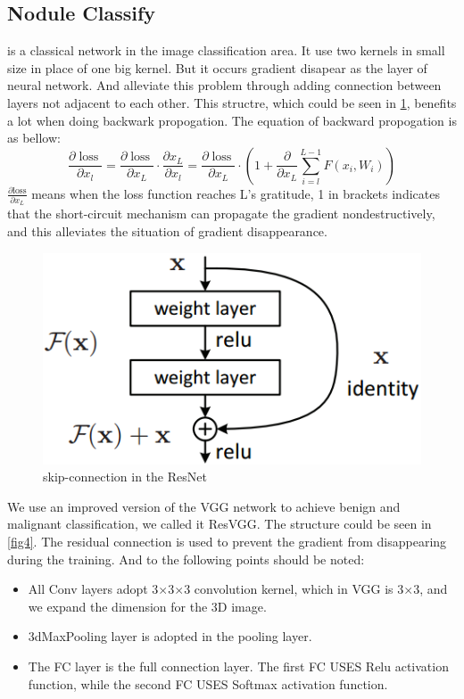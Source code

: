 \documentclass[conference]{IEEEtran}
\begin{document}
\subsection{Nodule Classify}
\cite{1409.1556} is a classical network in the image classification area. It use two kernels in small size in place of one big kernel.
But it occurs gradient disapear as the layer of neural network. And \cite{1512.03385} alleviate this problem through adding connection between
layers not adjacent to each other. This structre, which could be seen in \ref{resnet}, benefits a lot when doing backwark propogation.
The equation of backward propogation is as bellow:
\begin{equation}\frac{\partial \operatorname{loss}}{\partial x_{l}}=\frac{\partial \operatorname{loss}}{\partial x_{L}} \cdot \frac{\partial x_{L}}{\partial x_{l}}=\frac{\partial \operatorname{loss}}{\partial x_{L}} \cdot\left(1+\frac{\partial}{\partial x_{L}} \sum_{i=l}^{L-1} F\left(x_{i}, W_{i}\right)\right)\end{equation}
$\frac{\partial \text {loss}}{\partial x_{L}}$ means when the loss function reaches L's gratitude, 1 in brackets indicates that the short-circuit mechanism can propagate the gradient nondestructively, and this alleviates the situation of
gradient disappearance.
\begin{figure}[htbp]
    \centerline{\includegraphics[scale=0.3]{resnet.jpg}}
    \caption{skip-connection in the ResNet}
    \label{resnet}
    \end{figure}
We use an improved version of the VGG network to achieve benign and malignant classification, we called it ResVGG. The structure could be seen in \ref{fig4}. The residual connection is used to prevent the gradient from disappearing during the training. And to the following points should be noted:
\begin{itemize}
    \item All Conv layers adopt 3$\times$3$\times$3 convolution kernel, which in VGG is 3$\times$3, and we expand the dimension for the 3D image.
    \item 3dMaxPooling layer is adopted in the pooling layer.
    \item The FC layer is the full connection layer. The first FC USES Relu activation function, while the second FC USES Softmax activation function.
\end{itemize}
\end{document}
